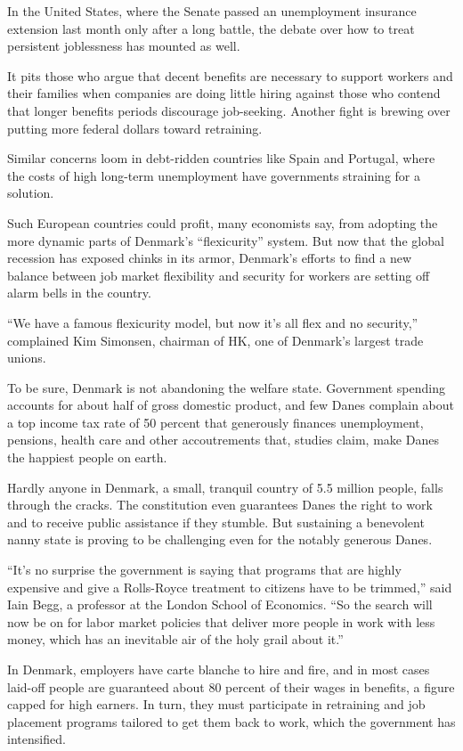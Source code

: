 ﻿\documentclass[12pt]{article}
\begin{document}
In the United States, where the Senate passed an unemployment insurance extension last month only
after a long battle, the debate over how to treat persistent joblessness has mounted as well.

It pits those who argue that decent benefits are necessary to support workers and their families
when companies are doing little hiring against those who contend that longer benefits periods
discourage job-seeking. Another fight is brewing over putting more federal dollars toward
retraining.

Similar concerns loom in debt-ridden countries like Spain and Portugal, where the costs of high
long-term unemployment have governments straining for a solution.

Such European countries could profit, many economists say, from adopting the more dynamic parts of
Denmark's ``flexicurity'' system. But now that the global recession has exposed chinks in its armor,
Denmark's efforts to find a new balance between job market flexibility and security for workers are
setting off alarm bells in the country.

``We have a famous flexicurity model, but now it's all flex and no security,'' complained Kim
Simonsen, chairman of HK, one of Denmark's largest trade unions.

To be sure, Denmark is not abandoning the welfare state. Government spending accounts for about half
of gross domestic product, and few Danes complain about a top income tax rate of 50 percent that
generously finances unemployment, pensions, health care and other accoutrements that, studies claim,
make Danes the happiest people on earth.

Hardly anyone in Denmark, a small, tranquil country of 5.5 million people, falls through the cracks.
The constitution even guarantees Danes the right to work and to receive public assistance if they
stumble. But sustaining a benevolent nanny state is proving to be challenging even for the notably
generous Danes.

``It's no surprise the government is saying that programs that are highly expensive and give a
Rolls-Royce treatment to citizens have to be trimmed,'' said Iain Begg, a professor at the London
School of Economics. ``So the search will now be on for labor market policies that deliver more
people in work with less money, which has an inevitable air of the holy grail about it.''

In Denmark, employers have carte blanche to hire and fire, and in most cases laid-off people are
guaranteed about 80 percent of their wages in benefits, a figure capped for high earners. In turn,
they must participate in retraining and job placement programs tailored to get them back to work,
which the government has intensified.
\end{document}
